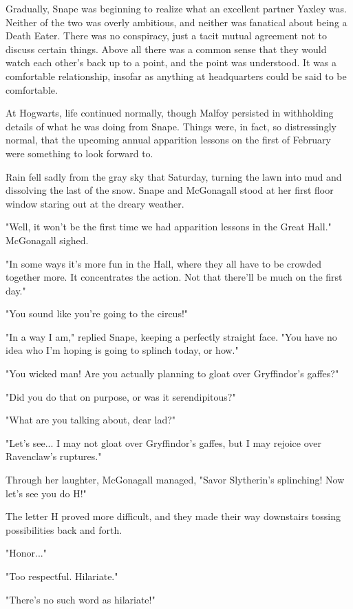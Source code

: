 \documentclass[a4paper,11pt]{article}
\begin{document}
Gradually, Snape was beginning to realize what an excellent partner Yaxley was. Neither of the two was overly ambitious, and neither was fanatical about being a Death Eater. There was no conspiracy, just a tacit mutual agreement not to discuss certain things. Above all there was a common sense that they would watch each other's back up to a point, and the point was understood. It was a comfortable relationship, insofar as anything at headquarters could be said to be comfortable.

At Hogwarts, life continued normally, though Malfoy persisted in withholding details of what he was doing from Snape. Things were, in fact, so distressingly normal, that the upcoming annual apparition lessons on the first of February were something to look forward to.

Rain fell sadly from the gray sky that Saturday, turning the lawn into mud and dissolving the last of the snow. Snape and McGonagall stood at her first floor window staring out at the dreary weather.

"Well, it won't be the first time we had apparition lessons in the Great Hall." McGonagall sighed.

"In some ways it's more fun in the Hall, where they all have to be crowded together more. It concentrates the action. Not that there'll be much on the first day."

"You sound like you're going to the circus!"

"In a way I am," replied Snape, keeping a perfectly straight face. "You have no idea who I'm hoping is going to splinch today, or how."

"You wicked man! Are you actually planning to gloat over Gryffindor's gaffes?"

"Did you do that on purpose, or was it serendipitous?"

"What are you talking about, dear lad?"

"Let's see... I may not gloat over Gryffindor's gaffes, but I may rejoice over Ravenclaw's ruptures."

Through her laughter, McGonagall managed, "Savor Slytherin's splinching! Now let's see you do H!"

The letter H proved more difficult, and they made their way downstairs tossing possibilities back and forth.

"Honor..."

"Too respectful. Hilariate."

"There's no such word as hilariate!"
\end{document}
